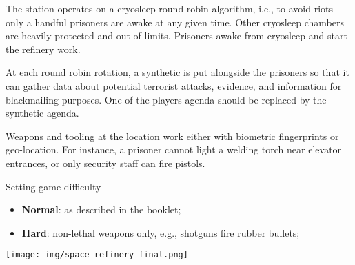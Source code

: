 The station operates on a cryosleep round robin algorithm, i.e., to avoid riots only a handful prisoners are awake at any given time. Other cryosleep chambers are heavily protected and out of limits. Prisoners awake from cryosleep and start the refinery work. 

At each round robin rotation, a synthetic is put alongside the prisoners so that it can gather data about potential terrorist attacks, evidence, and information for blackmailing purposes. One of the players agenda should be replaced by the synthetic agenda. 


Weapons and tooling at the location work either with biometric fingerprints or geo-location. For instance, a prisoner cannot light a welding torch near elevator entrances, or only security staff can fire pistols.





\medskip
\begin{rpg-commentbox}{Setting game difficulty}
\begin{itemize}
    \item \textbf{Normal}: as described in the booklet;
    \item \textbf{Hard}: non-lethal weapons only, e.g., shotguns fire rubber bullets;
\end{itemize}
\end{rpg-commentbox}

\newsect

\newpage

\begin{sidewaysfigure*}
    \centering
    \texttt{[image: img/space-refinery-final.png]}
    \label{fig:refinery}
\end{sidewaysfigure*}

\newpage